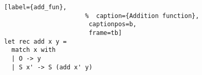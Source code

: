 \begin{figure}[!t]
  \centering
  \begin{minipage}{\columnwidth}
    \begin{lstlisting}[label={add_fun},
                      %  caption={Addition function},
                       captionpos=b,
                       frame=tb]
let rec add x y =
  match x with
  | O -> y
  | S x' -> S (add x' y)
    \end{lstlisting}
  \end{minipage}
\end{figure}